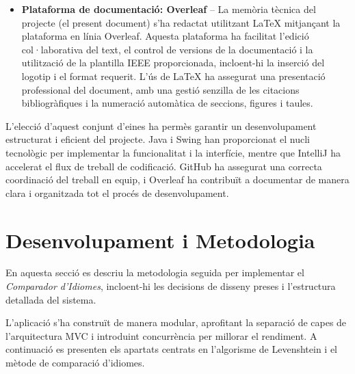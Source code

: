 \documentclass{ieeetj}
\begin{document}
\begin{itemize}
    \item \textbf{Plataforma de documentació: Overleaf} – La memòria tècnica del projecte (el present document) s’ha redactat utilitzant LaTeX mitjançant la plataforma en línia Overleaf. \newline Aquesta plataforma ha facilitat l’edició col·laborativa del text, el control de versions de la documentació i la utilització de la plantilla IEEE proporcionada, incloent-hi la inserció del logotip i el format requerit. \newline
    L’ús de LaTeX ha assegurat una presentació professional del document, amb una gestió senzilla de les citacions bibliogràfiques i la numeració automàtica de seccions, figures i taules.
\end{itemize}

L’elecció d’aquest conjunt d’eines ha permès garantir un desenvolupament estructurat i eficient del projecte. Java i Swing han proporcionat el nucli tecnològic per implementar la funcionalitat i la interfície, mentre que IntelliJ ha accelerat el flux de treball de codificació. GitHub ha assegurat una correcta coordinació del treball en equip, i Overleaf ha contribuït a documentar de manera clara i organitzada tot el procés de desenvolupament.



\section{Desenvolupament i Metodologia}
En aquesta secció es descriu la metodologia seguida per implementar el \emph{Comparador d’Idiomes}, incloent-hi les decisions de disseny preses i l’estructura detallada del sistema. \newline

L’aplicació s’ha construït de manera modular, aprofitant la separació de capes de l’arquitectura MVC i introduint concurrència per millorar el rendiment. A continuació es presenten els apartats centrats en l’algorisme de Levenshtein i el mètode de comparació d’idiomes.
\end{document}
